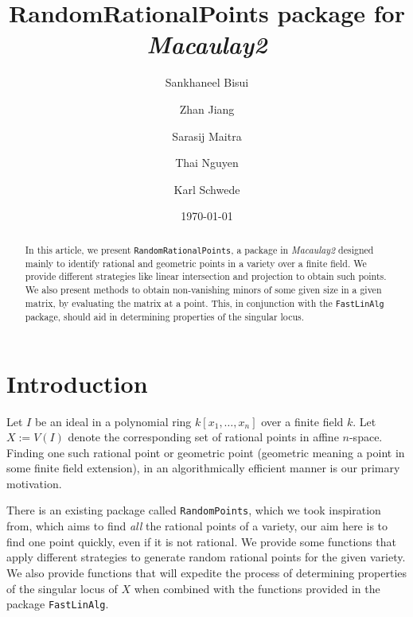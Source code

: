 \documentclass[11pt]{amsart}
\theoremstyle{definition}
\begin{document}
\title{{RandomRationalPoints} package for \emph{Macaulay2}}
\author{Sankhaneel Bisui}
\address{Tulane University}
\author{Zhan Jiang}
\address{University of Michigan}
\author{Sarasij Maitra}
\address{University of Virginia}
\author{Thai Nguyen}
\address{Tulane University}
\author{Karl Schwede}
\address{Department of Mathematics, University of Utah, 155 S 1400 E Room 233, Salt Lake City, UT, 84112}
\date{\today}

\begin{abstract}
In this article, we present {\tt RandomRationalPoints}, a package in \emph{Macaulay2} designed mainly to identify rational and geometric points in a variety over a finite field. We provide different strategies like linear intersection and projection to obtain such points. We also present methods to obtain non-vanishing minors of some given size in a given matrix, by evaluating the matrix at a point.  This, in conjunction with the {\tt FastLinAlg} package, should aid in determining properties of the singular locus.
\end{abstract}

 

\maketitle

\section{Introduction}
 Let $I$ be an ideal in a polynomial ring $k[x_1,\dots, x_n]$ over a finite field $k$. Let $X:=V(I)$ denote the corresponding set of rational points in affine $n$-space. Finding one such rational point or geometric point (geometric meaning a point in some finite field extension), in an algorithmically efficient manner is our primary motivation. 
 
 There is an existing package called {\tt RandomPoints}, which we took inspiration from, which aims to find \emph{all} the rational points of a variety, our aim here is to find one point quickly, even if it is not rational.  
 We provide some functions that apply different strategies to generate random rational points for the given variety. We also provide functions that will expedite the process of determining properties of the singular locus of $X$ when combined with the functions provided in the package {\tt FastLinAlg}.  
 
\end{document}
